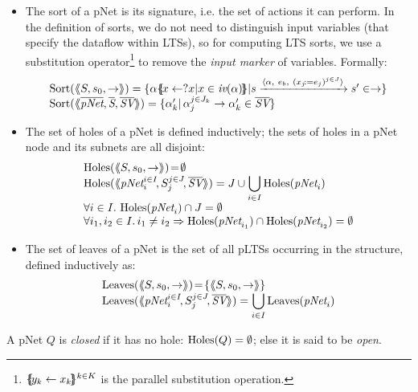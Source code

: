 \documentclass{lncs/llncs}
\begin{document}
\begin{definition}
  \begin{itemize}
  \item The sort of a pNet is its signature, i.e. the set of actions it can
perform. In the definition of sorts, we do not need to distinguish
input variables (that specify the dataflow within LTSs), so for
computing LTS sorts, we use a substitution operator\footnote{$\{\hspace{-0.88ex}\{\!y_k\gets x_k\!\}\hspace{-0.87ex}\}^{k\in K}$ is the parallel substitution 
operation.} to remove the
\emph{input marker} of variables. Formally:
\[
\begin{array}{l}
\Sort(\mylangle S,s_0, \to\myrangle) = \{\alpha\subst{x \gets ?x| 
x\in\symb{iv}(\alpha)}|s \xrightarrow{\langle \alpha,~e_b,~(x_j\!:= {e}_j)^{j\in
		J}\rangle} s'\in \to \} \\ \Sort(\mylangle
\set{\pNet}, \set{\symb{S}}, \set{\symb{SV}}\myrangle) =\{\alpha'_k |\, \alpha_j^{j\in J_k}\to\alpha'_k\in\set{\symb{SV}}\}
\end{array}
\]

\item
The set of holes of a pNet is defined inductively; the sets of holes
in a pNet node and its subnets are all disjoint:
  \[\begin{array}{l}
\Holes(\mylangle S,s_0, \to\myrangle) \!=\! \emptyset \\
\Holes(\mylangle \pNet_i^{i\in I}\!,S_j^{j\in J}\!, \overline{\symb{SV}}\myrangle) =J\cup{\displaystyle \bigcup_{i\in I}\Holes(\pNet_i)}\\
\forall i\in I.\, \Holes(\pNet_i)\cap J=\emptyset\\
\forall i_1,i_2\in I.\,i_1\neq i_2\Rightarrow  \Holes(\pNet_{i_1})\cap\Holes(\pNet_{i_2})=\emptyset
\end{array}\]
\item
The set of leaves of a pNet is the set of all pLTSs occurring in the structure, defined inductively as:
\[\begin{array}{l}
\Leaves(\mylangle S,s_0, \to\myrangle) \!=\! \{ \mylangle S,s_0, \to\myrangle \}\\
\Leaves(\mylangle \pNet_i^{i\in I}\!,S_j^{j\in J}\!, \overline{\symb{SV}}\myrangle) = {\displaystyle \bigcup_{i\in I}\Leaves(\pNet_i)}
\end{array}\]
\end{itemize}
\end{definition}

A pNet $Q$ is \emph{closed} if it has no hole: $\operatorname{Holes}(Q)=\emptyset$; else it
is said to be \emph{open}.
\end{document}
